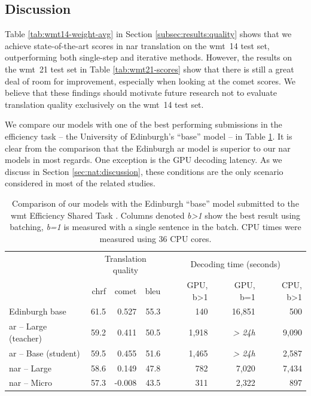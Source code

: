 \subsection{Discussion}%
\label{subsec:results:discussion}

Table \ref{tab:wmt14-weight-avg} in Section \ref{subsec:results:quality} shows
that we achieve state-of-the-art scores in \acl{nar} translation on the
\acs{wmt}~14 test set, outperforming both single-step and iterative
methods. However, the results on the \acs{wmt}~21 test set in Table
\ref{tab:wmt21-scores} show that there is still a great deal of room for
improvement, especially when looking at the \acs{comet} scores. We believe that
these findings should motivate future research not to evaluate translation
quality exclusively on the \acs{wmt}~14 test set.

We compare our models with one of the best performing submissions in the
efficiency task -- the University of Edinburgh's ``base'' model
\citep{Behnke-wmt21-speed} -- in Table \ref{tab:efficiency:comparison}. It is
clear from the comparison that the Edinburgh \acl{ar} model is superior to our
\ac{nar} models in most regards. One exception is the GPU decoding latency. As
we discuss in Section \ref{sec:nat:discussion}, these conditions are the only
scenario considered in most of the related studies.

\begin{table}
  \centering

  \begin{tabular}{lrrrrrr}
    \toprule
    & \multicolumn{3}{c}{Translation quality} & \multicolumn{3}{c}{Decoding time (seconds)} \\
    & {\small \acs{chrf}} & {\small \acs{comet}} & {\small \acs{bleu}} & {\small GPU, b>1} & {\small GPU, b=1} & {\small CPU, b>1} \\
    \midrule
    Edinburgh base & 61.5 & 0.527 & 55.3 & 140 & 16,851 & 500 \\
    \midrule
    \acs{ar} -- Large (teacher) & 59.2 & 0.411 & 50.5 & 1,918 & {\it > 24h} & 9,090 \\
    \acs{ar} -- Base (student) & 59.5 & 0.455 & 51.6 & 1,465 & {\it > 24h} & 2,587 \\
    \addlinespace
    \acs{nar} -- Large & 58.6 & 0.149 & 47.8 & 782 & 7,020 & 7,434 \\
    \acs{nar} -- Micro & 57.3 & -0.008 & 43.5 & 311 & 2,322 & 897 \\
    \bottomrule
  \end{tabular}

  \caption{Comparison of our models with the Edinburgh ``base'' model submitted
    to the \acs{wmt} Efficiency Shared Task \citep{Behnke-wmt21-speed}. Columns
    denoted \emph{b>1} show the best result using batching, \emph{b=1} is
    measured with a single sentence in the batch. CPU times were measured using
    36 CPU cores.} %
  \label{tab:efficiency:comparison}
\end{table}

